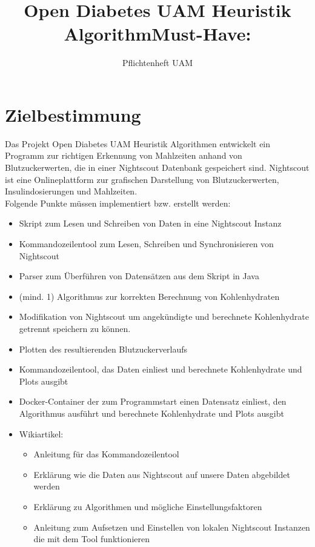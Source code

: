 \documentclass[accentcolor=tud0b,12pt,paper=a4]{tudreport}
\title{Open Diabetes UAM Heuristik Algorithm}
\subtitle{Pflichtenheft UAM}
\begin{document}
	\maketitle
	\tableofcontents 
	\newpage
	\chapter{Zielbestimmung}
	
	Das Projekt Open Diabetes UAM Heuristik Algorithmen entwickelt ein Programm zur richtigen Erkennung von Mahlzeiten anhand von Blutzuckerwerten, die in einer Nightscout Datenbank gespeichert sind. 
	Nightscout ist eine Onlineplattform zur grafischen Darstellung von Blutzuckerwerten, Insulindosierungen und Mahlzeiten. \\

Folgende Punkte müssen implementiert bzw. erstellt werden:\\

\title{\textbf{Must-Have:}}
\begin{itemize}
	\item Skript zum Lesen und Schreiben von Daten in eine Nightscout Instanz	
	\item Kommandozeilentool zum Lesen, Schreiben und Synchronisieren von Nightscout
	\item Parser zum Überführen von Datensätzen aus dem Skript in Java
	\item (mind. 1) Algorithmus zur korrekten Berechnung von Kohlenhydraten
	\item Modifikation von Nightscout um angekündigte und berechnete Kohlenhydrate getrennt speichern  zu können.      %
	\item Plotten des resultierenden Blutzuckerverlaufs 
	\item Kommandozeilentool, das Daten einliest und berechnete Kohlenhydrate und Plots ausgibt
	\item Docker-Container der zum Programmstart einen Datensatz einliest, den Algorithmus ausführt und berechnete Kohlenhydrate und Plots ausgibt

	\item Wikiartikel:
	\begin{itemize}
	\item Anleitung für das Kommandozeilentool
	\item Erklärung wie die Daten aus Nightscout auf unsere Daten abgebildet werden
	\item Erklärung zu Algorithmen und mögliche Einstellungsfaktoren
	\item Anleitung zum Aufsetzen und Einstellen von lokalen Nightscout Instanzen die mit dem Tool funktionieren
	\end{itemize}

\end{itemize}
\end{document}
